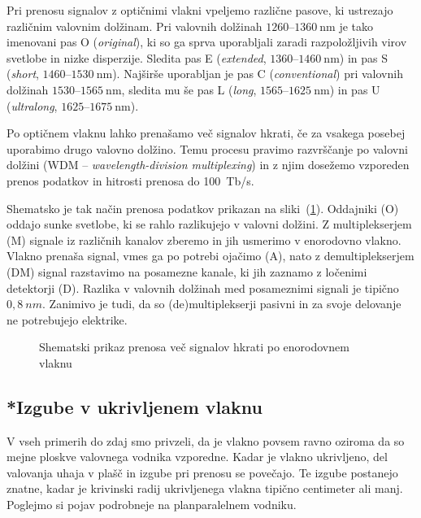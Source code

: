 \begin{remark}
Pri prenosu signalov z optičnimi vlakni vpeljemo različne pasove, ki ustrezajo 
različnim valovnim dolžinam. Pri valovnih dolžinah $1260$--$1360~\si{\nano\meter}$ je tako imenovani
pas O ({\it original}), ki so ga sprva uporabljali zaradi razpoložljivih virov svetlobe
in nizke disperzije. Sledita pas E ({\it extended}, $1360$--$1460~\si{\nano\meter}$) in pas S 
({\it short}, $1460$--$1530~\si{\nano\meter}$). 
Najširše uporabljan je pas C ({\it conventional}) pri valovnih dolžinah $1530$--$1565~\si{\nano\meter}$,
sledita mu še pas L ({\it long}, $1565$--$1625~\si{\nano\meter}$) in pas U 
({\it ultralong}, $1625$--$1675~\si{\nano\meter}$).

Po optičnem vlaknu lahko prenašamo več signalov hkrati, če za vsakega posebej uporabimo
drugo valovno dolžino. Temu procesu pravimo razvrščanje po valovni dolžini
(WDM -- {\it wavelength-division multiplexing})
 in z njim dosežemo vzporeden prenos podatkov in hitrosti prenosa do 100~Tb/s.
 
Shematsko je tak način prenosa podatkov prikazan na sliki~(\ref{WDM}).
Oddajniki (O) oddajo sunke svetlobe, ki se rahlo razlikujejo v valovni dolžini. 
Z multiplekserjem (M) signale iz različnih kanalov zberemo in jih usmerimo v 
enorodovno vlakno. Vlakno prenaša signal, vmes ga po potrebi ojačimo (A), 
nato z demultiplekserjem (DM) signal razstavimo na posamezne kanale, ki jih 
zaznamo z ločenimi detektorji (D). Razlika v valovnih dolžinah med posameznimi signali 
je tipično $0,8~\si{nm}$. Zanimivo je tudi, da so (de)multiplekserji pasivni in za 
svoje delovanje ne potrebujejo elektrike.

\begin{figure}[h]
\centering
\def\svgwidth{120truemm} 
 
\caption{Shematski prikaz prenosa več signalov hkrati po enorodovnem vlaknu}
\label{WDM}
\end{figure}
\end{remark}

\subsection*{*Izgube v ukrivljenem vlaknu}
V vseh primerih do zdaj smo privzeli, da je vlakno povsem ravno 
oziroma da so mejne ploskve valovnega vodnika vzporedne. 
Kadar je vlakno ukrivljeno, del valovanja uhaja v plašč in 
izgube pri prenosu se povečajo. Te izgube postanejo znatne, 
kadar je krivinski radij ukrivljenega vlakna tipično centimeter ali manj. 
Poglejmo si pojav podrobneje na planparalelnem vodniku.

